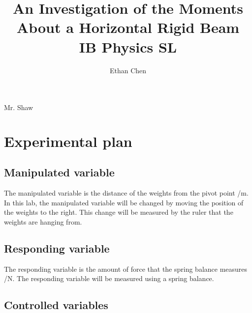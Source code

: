 \documentclass[letterpaper, 12pt]{article}
\title{An Investigation of the Moments\\ About a Horizontal Rigid Beam \\ IB Physics SL}
\author{Ethan Chen}
\begin{document}
\maketitle

\begin{center}
    Mr. Shaw
\end{center}

\section{Experimental plan}

\subsection{Manipulated variable}
The manipulated variable is the distance of the weights from the pivot point /\unit{m}.
In this lab, the manipulated variable will be changed by moving the position of the weights to the right.
This change will be measured by the ruler that the weights are hanging from.

\subsection{Responding variable}
The responding variable is the amount of force that the spring balance measures /\unit{N}.
The responding variable will be measured using a spring balance.


\subsection{Controlled variables}
\end{document}
